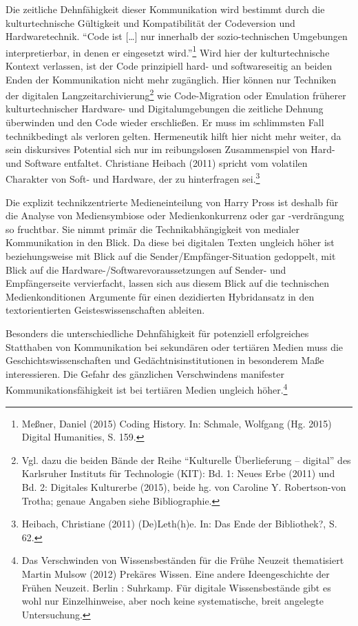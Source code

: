 \documentclass[a4paper,
fontsize=11pt,
oneside,
numbers=noperiodatend,
parskip=half-,
bibliography=totoc,
final
]{scrartcl}
\begin{document}
Die zeitliche Dehnfähigkeit dieser Kommunikation wird bestimmt durch die
kulturtechnische Gültigkeit und Kompatibilität der Codeversion und
Hardwaretechnik. \enquote{Code ist {[}\ldots{}{]} nur innerhalb der
sozio-technischen Umgebungen interpretierbar, in denen er eingesetzt
wird.}\footnote{Meßner, Daniel (2015) Coding History. In: Schmale,
  Wolfgang (Hg. 2015) Digital Humanities, S. 159.} Wird hier der
kulturtechnische Kontext verlassen, ist der Code prinzipiell hard- und
softwareseitig an beiden Enden der Kommunikation nicht mehr zugänglich.
Hier können nur Techniken der digitalen Langzeitarchivierung\footnote{Vgl.
  dazu die beiden Bände der Reihe \enquote{Kulturelle Überlieferung --
  digital} des Karlsruher Instituts für Technologie (KIT): Bd. 1: Neues
  Erbe (2011) und Bd. 2: Digitales Kulturerbe (2015), beide hg. von
  Caroline Y. Robertson-von Trotha; genaue Angaben siehe Bibliographie.}
wie Code-Migration oder Emulation früherer kulturtechnischer Hardware-
und Digitalumgebungen die zeitliche Dehnung überwinden und den Code
wieder erschließen. Er muss im schlimmsten Fall technikbedingt als
verloren gelten. Hermeneutik hilft hier nicht mehr weiter, da sein
diskursives Potential sich nur im reibungslosen Zusammenspiel von Hard-
und Software entfaltet. Christiane Heibach (2011) spricht vom volatilen
Charakter von Soft- und Hardware, der zu hinterfragen sei.\footnote{Heibach,
  Christiane (2011) (De)Leth(h)e. In: Das Ende der Bibliothek?, S. 62.}

Die explizit technikzentrierte Medieneinteilung von Harry Pross ist
deshalb für die Analyse von Mediensymbiose oder Medienkonkurrenz oder
gar -verdrängung so fruchtbar. Sie nimmt primär die Technikabhängigkeit
von medialer Kommunikation in den Blick. Da diese bei digitalen Texten
ungleich höher ist beziehungsweise mit Blick auf die
Sender/Empfänger-Situation gedoppelt, mit Blick auf die
Hardware-/Softwarevoraussetzungen auf Sender- und Empfängerseite
vervierfacht, lassen sich aus diesem Blick auf die technischen
Medienkonditionen Argumente für einen dezidierten Hybridansatz in den
textorientierten Geisteswissenschaften ableiten.

Besonders die unterschiedliche Dehnfähigkeit für potenziell
erfolgreiches Statthaben von Kommunikation bei sekundären oder tertiären
Medien muss die Geschichtswissenschaften und Gedächtnisinstitutionen in
besonderem Maße interessieren. Die Gefahr des gänzlichen Verschwindens
manifester Kommunikationsfähigkeit ist bei tertiären Medien ungleich
höher.\footnote{Das Verschwinden von Wissensbeständen für die Frühe
  Neuzeit thematisiert Martin Mulsow (2012) Prekäres Wissen. Eine andere
  Ideengeschichte der Frühen Neuzeit. Berlin : Suhrkamp. Für digitale
  Wissensbestände gibt es wohl nur Einzelhinweise, aber noch keine
  systematische, breit angelegte Untersuchung.}
\end{document}
